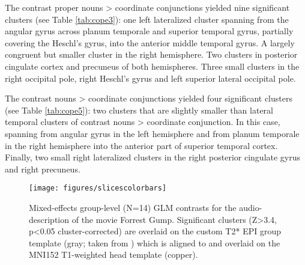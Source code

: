 \documentclass[10pt,a4paper,onecolumn]{article}
\begin{document}
The contrast proper nouns > coordinate conjunctions yielded nine significant
clusters (see Table \ref{tab:cope3}):
one left lateralized cluster spanning from the angular gyrus across planum
temporale and superior temporal gyrus, partially covering the Heschl's gyrus,
into the anterior middle temporal gyrus.
A largely congruent but smaller cluster in the right hemisphere.
Two clusters in posterior cingulate cortex and precuneus of both hemispheres.
Three small clusters in the right occipital pole, right Heschl's gyrus and left
superior lateral occipital pole.

The contrast nouns > coordinate conjunctions yielded four significant clusters (see Table \ref{tab:cope5}):
two clusters that are slightly smaller than lateral temporal clusters of contrast nouns > coordinate conjunction.
In this case, spanning from angular gyrus in the left hemisphere and from planum temporale in the right hemisphere into the anterior part of superior temporal cortex.
Finally, two small right lateralized clusters in the right posterior cingulate
gyrus and right precuneus.


\begin{figure*} \centering
    \texttt{[image: figures/slicescolorbars]}
    \caption{Mixed-effects group-level (N=14) GLM contrasts for the
        audio-description of the movie Forrest Gump. Significant clusters
        (Z>3.4, p<0.05 cluster-corrected) are overlaid on the custom T2* EPI
        group template (gray; taken from \citep{hanke2014audiomovie}) which is
    aligned to and overlaid on the MNI152 T1-weighted head template (copper).}
    \label{fig:results} \end{figure*}
\end{document}
